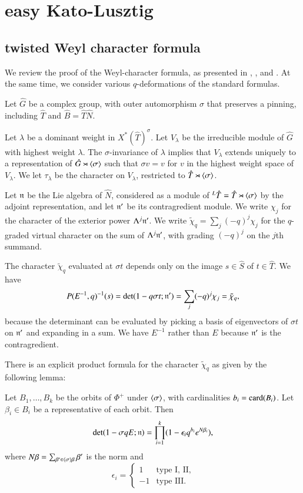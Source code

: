\newpage 
\section{easy Kato-Lusztig}

\subsection{twisted Weyl character formula}

We review the proof of the Weyl-character formula, as presented in \cite{kostant1961lie}, \cite{jantzen1977darstellungen}, and \cite{wendt2001weyl}.
At the same time, we consider various $q$-deformations of the standard formulas.

Let $\hat G$ be a complex group, with outer automorphism $\sigma$ that preserves a pinning, including
$\hat T$ and $\hat B = \hat T \hat N$.

Let $\lambda$ be a dominant weight in $X^*(\hat T)^\sigma$.  Let $V_\lambda$ be the irreducible module
of $\hat G$ with highest weight $\lambda$.  The $\sigma$-invariance of $\lambda$ implies that $V_\lambda$
extends uniquely to a representation of $\hat G \rtimes \langle{\sigma}\rangle$ such that $\sigma v = v$ for $v$ in the
highest weight space of $V_\lambda$.  We let $\tau_\lambda$ be the character on $V_\lambda$, restricted to $\hat T\rtimes\langle{\sigma}\rangle$.

Let ${\mathfrak n}$ be the Lie algebra of $\hat N$, considered as a module of ${}^L\hat T=\hat T\rtimes\langle{\sigma}\rangle$ by the adjoint representation,
and let ${\mathfrak n}'$ be its contragredient module.  We write $\chi_j$ for the character of the exterior power $\Lambda^j {\mathfrak n}'$.
  We write $\tilde\chi_q = \sum_j (-q)^j\chi_j$
for the $q$-graded virtual character on the sum of $\Lambda^j {\mathfrak n}'$, with grading $(-q)^j$ on the $j$th summand.  

The character $\tilde\chi_q$ evaluated at $\sigma t$ depends only on the image $s\in\hat S$ of $t\in \hat T$.
We have 
\[
P(E^{-1},q)^{-1}(s) = \det(1 - q\sigma t;{\mathfrak n}') = \sum_j (-q)^j \chi_j = \tilde\chi_q,
\]
because the determinant can be evaluated by picking a basis of eigenvectors of $\sigma t$ on ${\mathfrak n}'$ and expanding in a sum.
We have $E^{-1}$ rather than $E$ because ${\mathfrak n}'$ is the contragredient.

There is an explicit product formula for the character $\tilde\chi_q$ as given by the following lemma:

\begin{lemma} \label{eqn:weyl-product}
Let $B_1,\ldots,B_k$ be the orbits of $\Phi^+$ under $\langle{\sigma}\rangle$, with cardinalities $b_i = {\operatorname{card}}(B_i)$.
Let $\beta_i\in B_i$ be a representative of each orbit.
Then
\[
\det(1-\sigma  q E;{\mathfrak n}) = \prod_{i=1}^k (1- \epsilon_i q^{b_i} e^{N\beta_i}),
\]
where 
$N\beta = \sum_{\beta'\in \langle{\sigma}\rangle\beta} \beta'$ is the norm and
\[
\epsilon_i=\begin{cases} 1 & \text{type I, II},\\
     -1 & \text{type III}.
\end{cases}
\]
\end{lemma}

